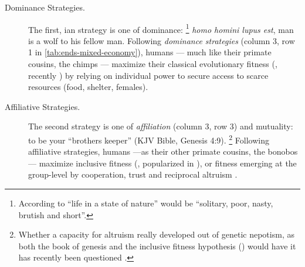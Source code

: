 \begin{description}
	\item[Dominance Strategies.] The first, \citeauthor{Hobbes-1651-aa}ian \citeyearpar{Hobbes-1651-aa}
	strategy is one of dominance:
	\footnote{
		According to \cite{Hobbes-1651-aa} ``life in a state of nature'' would be ``solitary, poor, nasty, brutish and short''.
	}
\emph{homo homini lupus est}, man is a wolf to his fellow man.
Following \emph{dominance strategies} (column 3, row 1 in \autoref{tab:ends-mixed-economy}), humans --- much like their primate cousins, the chimps --- maximize their classical evolutionary fitness (\citealt{Darwin1859}, recently \citealt{Dawkins1976}) by relying on individual power to secure access to scarce resources (food, shelter, females).

	\item[Affiliative Strategies.] The second strategy is one of \emph{affiliation} (column 3, row 3) and mutuality:
	to be your ``brothers keeper'' (\gls{KJV} Bible, Genesis 4:9).
	\footnote{
		Whether a capacity for altruism really developed out of genetic nepotism, as both the book of genesis and the inclusive fitness hypothesis (\citealt{Hamilton1964,Wilson1975}) would have it has recently been questioned \citep{Wilson2012}.
	}
	Following affiliative strategies, humans ---as their other primate cousins, the bonobos --- maximize inclusive fitness (\citealt{Hamilton1964}, popularized in \citealt{Wilson1975}), or fitness emerging at the group-level \citep{Wilson2012} by cooperation, trust and reciprocal altruism \citeyearpar[202ff]{Pickett-2009-kx}.
\end{description}



